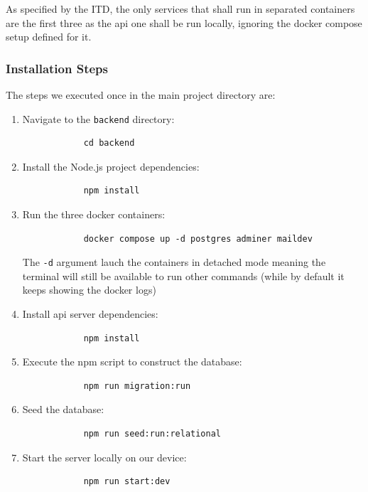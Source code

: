 As specified by the ITD, the only services that shall run in separated containers are the first three as the api one shall be run locally, ignoring the docker compose setup defined for it. 



\subsubsection*{Installation Steps}

The steps we executed once in the main project directory are:
\begin{enumerate}
    \item Navigate to the \verb|backend| directory:
        \begin{verbatim}
            cd backend
        \end{verbatim}
\item Install the Node.js project dependencies:
        \begin{verbatim}
            npm install
        \end{verbatim}
\item Run the three docker containers:
        \begin{verbatim}
            docker compose up -d postgres adminer maildev
        \end{verbatim}
The \verb|-d| argument lauch the containers in detached mode meaning the terminal will still be available to run other commands (while by default it keeps showing the docker logs)
\item Install api server dependencies:
        \begin{verbatim}
            npm install
        \end{verbatim}
\item Execute the npm script to construct the database:
        \begin{verbatim}
            npm run migration:run
        \end{verbatim}
\item Seed the database:
        \begin{verbatim}
            npm run seed:run:relational
        \end{verbatim}
\item Start the server locally on our device:
        \begin{verbatim}
            npm run start:dev
        \end{verbatim}
\end{enumerate}

